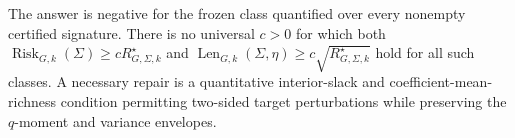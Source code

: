 The answer is negative for the frozen class quantified over every nonempty certified signature. There is no universal \(c>0\) for which both \(\operatorname{Risk}_{G,k}(\Sigma)\ge cR_{G,\Sigma,k}^{\star}\) and \(\operatorname{Len}_{G,k}(\Sigma,\eta)\ge c\sqrt{R_{G,\Sigma,k}^{\star}}\) hold for all such classes. A necessary repair is a quantitative interior-slack and coefficient-mean-richness condition permitting two-sided target perturbations while preserving the \(q\)-moment and variance envelopes.